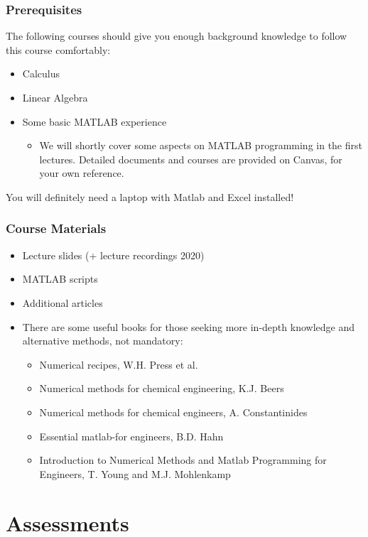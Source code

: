 \begin{frame}
 \frametitle{Prerequisites}
  The following courses should give you enough background knowledge to follow this course comfortably:
 \begin{itemize}
   \item Calculus
   \item Linear Algebra
   \item Some basic MATLAB experience
     \begin{itemize}
      \item We will shortly cover some aspects on MATLAB programming in the first lectures. Detailed documents and courses are provided on Canvas, for your own reference.     
    \end{itemize}
  \end{itemize}
  You will definitely need a laptop with Matlab and Excel installed!
\end{frame}

\begin{frame}
 \frametitle{Course Materials}
 \begin{itemize}
  \item Lecture slides (+ lecture recordings 2020)
  \item MATLAB scripts
  \item Additional articles
  \item There are some useful books for those seeking more in-depth knowledge and alternative methods, not mandatory:
  \begin{itemize}
    \item Numerical recipes, W.H. Press et al.
    \item Numerical methods for chemical engineering, K.J. Beers
    \item Numerical methods for chemical engineers, A. Constantinides
    \item Essential matlab-for engineers, B.D. Hahn
    \item Introduction to Numerical Methods and Matlab Programming for Engineers, T. Young and M.J. Mohlenkamp
  \end{itemize}
 \end{itemize}
\end{frame}

\section{Assessments}
